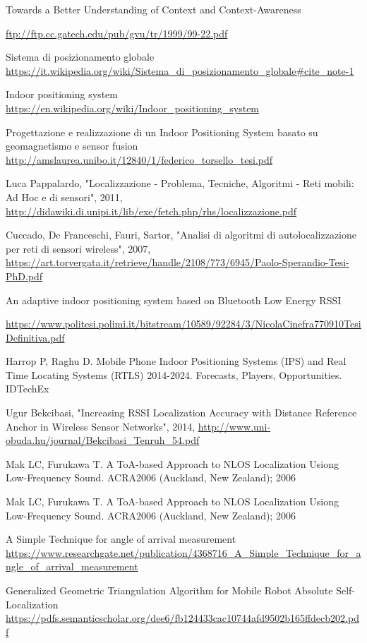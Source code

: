 \begin{thebibliography}{99}

Towards a Better Understanding of Context and Context-Awareness
\author{Anind K. Dey, Gregory D. Abowd}
\url{ftp://ftp.cc.gatech.edu/pub/gvu/tr/1999/99-22.pdf}

Sistema di posizionamento globale
\url{https://it.wikipedia.org/wiki/Sistema_di_posizionamento_globale#cite_note-1}


Indoor positioning system
\url{https://en.wikipedia.org/wiki/Indoor_positioning_system}

Progettazione e realizzazione di un Indoor Positioning System basato su geomagnetismo e sensor fusion
\url{http://amslaurea.unibo.it/12840/1/federico_torsello_tesi.pdf}

Luca Pappalardo, "Localizzazione - Problema, Tecniche, Algoritmi - Reti mobili:
Ad Hoc e di sensori", 2011,
\url{http://didawiki.di.unipi.it/lib/exe/fetch.php/rhs/localizzazione.pdf}

Cuccado, De Franceschi, Fauri, Sartor, "Analisi di algoritmi di autolocalizzazione
per reti di sensori wireless", 2007,
\url{https://art.torvergata.it/retrieve/handle/2108/773/6945/Paolo-Sperandio-Tesi-PhD.pdf}

An adaptive indoor positioning system based on Bluetooth Low Energy RSSI
\author{Nicola Cinefra}
\url{https://www.politesi.polimi.it/bitstream/10589/92284/3/NicolaCinefra770910TesiDefinitiva.pdf}

Harrop P, Raghu D. Mobile Phone Indoor Positioning Systems (IPS) and Real Time
Locating Systems (RTLS) 2014-2024. Forecasts, Players, Opportunities. IDTechEx



Ugur Bekcibasi, "Increasing RSSI Localization Accuracy with Distance Reference
Anchor in Wireless Sensor Networks", 2014,
\url{http://www.uni-obuda.hu/journal/Bekcibasi_Tenruh_54.pdf}

Mak LC, Furukawa T. A ToA-based Approach to NLOS Localization Usiong Low-Frequency Sound. ACRA2006 (Auckland, New Zealand); 2006

Mak LC, Furukawa T. A ToA-based Approach to NLOS Localization Usiong Low-Frequency Sound. ACRA2006 (Auckland, New Zealand); 2006

A Simple Technique for angle of arrival measurement
\url{https://www.researchgate.net/publication/4368716_A_Simple_Technique_for_angle_of_arrival_measurement}

Generalized Geometric Triangulation Algorithm for Mobile Robot
Absolute Self-Localization 
\url{https://pdfs.semanticscholar.org/dee6/fb124433cac10744afd9502b165ffdecb202.pdf}


\end{thebibliography}




